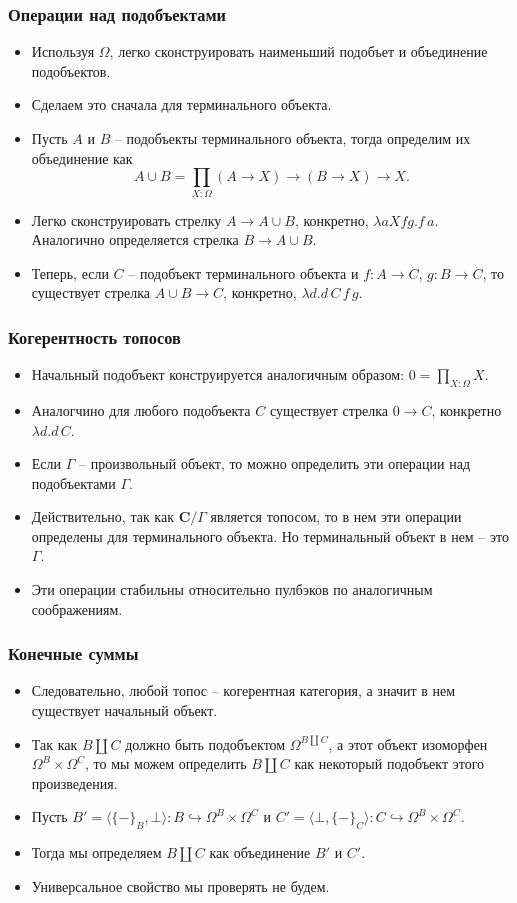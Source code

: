 \documentclass{beamer}
\theoremstyle{definition}
\newcommand{\cat}[1]{\mathbf{#1}}
\renewcommand{\C}{\cat{C}}
\begin{document}
\begin{frame}
\frametitle{Операции над подобъектами}
\begin{itemize}
\item Используя $\Omega$, легко сконструировать наименьший подобъет и объединение подобъектов.
\item Сделаем это сначала для терминального объекта.
\item Пусть $A$ и $B$ -- подобъекты терминального объекта, тогда определим их объединение как
\[ A \cup B = \prod\limits_{X : \Omega} (A \to X) \to (B \to X) \to X. \]
\item Легко сконструировать стрелку $A \to A \cup B$, конкретно, $\lambda a X f g. f\,a$. Аналогично определяется стрелка $B \to A \cup B$.
\item Теперь, если $C$ -- подобъект терминального объекта и $f : A \to C$, $g : B \to C$, то существует стрелка $A \cup B \to C$, конкретно, $\lambda d. d\,C\,f\,g$.
\end{itemize}
\end{frame}

\begin{frame}
\frametitle{Когерентность топосов}
\begin{itemize}
\item Начальный подобъект конструируется аналогичным образом: $0 = \prod\limits_{X : \Omega} X$.
\item Аналогчино для любого подобъекта $C$ существует стрелка $0 \to C$, конкретно $\lambda d. d\,C$.
\item Если $\Gamma$ -- произвольный объект, то можно определить эти операции над подобъектами $\Gamma$.
\item Действительно, так как $\C/\Gamma$ является топосом, то в нем эти операции определены для терминального объекта.
Но терминальный объект в нем -- это $\Gamma$.
\item Эти операции стабильны относительно пулбэков по аналогичным соображениям.
\end{itemize}
\end{frame}

\begin{frame}
\frametitle{Конечные суммы}
\begin{itemize}
\item Следовательно, любой топос -- когерентная категория, а значит в нем существует начальный объект.
\item Так как $B \amalg C$ должно быть подобъектом $\Omega^{B \amalg C}$, а этот объект изоморфен $\Omega^B \times \Omega^C$, то мы можем определить $B \amalg C$ как некоторый подобъект этого произведения.
\item Пусть $B' = \langle \{ -\}_B, \bot \rangle : B \hookrightarrow \Omega^B \times \Omega^C$ и $C' = \langle \bot, \{ -\}_C \rangle : C \hookrightarrow \Omega^B \times \Omega^C$.
\item Тогда мы определяем $B \amalg C$ как объединение $B'$ и $C'$.
\item Универсальное свойство мы проверять не будем.
\end{itemize}
\end{frame}
\end{document}
